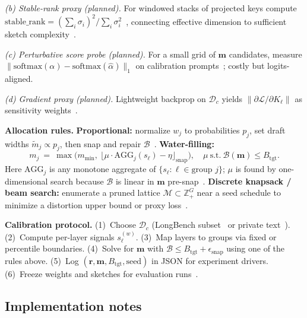 \documentclass[conference]{IEEEtran}
\begin{document}
\textit{(b) Stable-rank proxy (planned).}
For windowed stacks of projected keys compute $\mathrm{stable\_rank}=(\sum_i \sigma_i)^2/\sum_i \sigma_i^2$~\cite{rudelson2014}, connecting effective dimension to sufficient sketch complexity~\cite{woodruff2014}.

\textit{(c) Perturbative score probe (planned).}
For a small grid of \(\mathbf{m}\) candidates, measure \(\|\mathrm{softmax}(\alpha)-\mathrm{softmax}(\hat{\alpha})\|_1\) on calibration prompts~\cite{vitspec2021}; costly but logits-aligned.

\textit{(d) Gradient proxy (planned).}
Lightweight backprop on \(\mathcal{D}_c\) yields \(\|\partial \mathcal{L}/\partial K_\ell\|\) as sensitivity weights~\cite{fpguide2018}.

\textbf{Allocation rules.}
\textbf{Proportional:} normalize \(w_j\) to probabilities \(p_j\), set draft widths \(\tilde{m}_j \propto p_j\), then snap and repair \(\mathcal{B}\)~\cite{presentation_mqjl}. \textbf{Water-filling:}
\begin{equation}
m_j \ =\ \max\big(m_{\min},\ \lfloor \mu \cdot \mathrm{AGG}_j(s_\ell) - \eta \rfloor_{\text{snap}}\big), \quad \mu\ \mathrm{s.t.}\ \mathcal{B}(\mathbf{m})\le B_{\mathrm{tgt}} .
\end{equation}
Here \(\mathrm{AGG}_j\) is any monotone aggregate of \(\{s_\ell:\ell\in\text{group }j\}\); \(\mu\) is found by one-dimensional search because \(\mathcal{B}\) is linear in \(\mathbf{m}\) pre-snap~\cite{presentation_mqjl}. \textbf{Discrete knapsack / beam search:} enumerate a pruned lattice \(\mathcal{M}\subset\mathbb{Z}_{+}^G\) near a seed schedule to minimize a distortion upper bound or proxy loss~\cite{presentation_mqjl}.

\textbf{Calibration protocol.} (1)~Choose \(\mathcal{D}_c\) (LongBench subset~\cite{bai2023longbench} or private text~\cite{presentation_mqjl}). (2)~Compute per-layer signals \(s_{\ell}^{(w)}\). (3)~Map layers to groups via fixed or percentile boundaries. (4)~Solve for \(\mathbf{m}\) with \(\mathcal{B}\le B_{\mathrm{tgt}}+\epsilon_{\mathrm{snap}}\) using one of the rules above. (5)~Log \((\mathbf{r},\mathbf{m},B_{\mathrm{tgt}},\mathrm{seed})\) in JSON for experiment drivers. (6)~Freeze weights and sketches for evaluation runs~\cite{presentation_mqjl,zandieh2024aqjl-repo}.

\subsection{Implementation notes}
\label{sec:impl}
\end{document}
